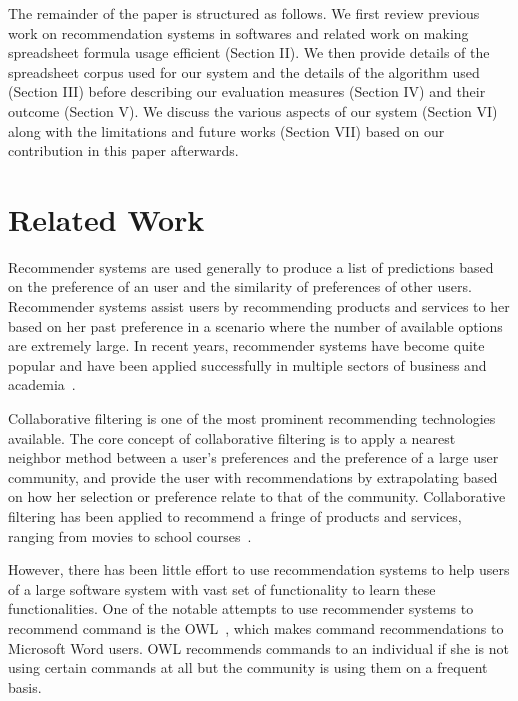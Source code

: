 \documentclass[conference]{IEEEtran}
\begin{document}
The remainder of the paper is structured as follows. We first review previous work on recommendation systems in softwares and related work on making spreadsheet formula usage efficient (Section II). We then provide details of the spreadsheet corpus used for our system and the details of the algorithm used (Section III) before describing our evaluation measures (Section IV) and their outcome (Section V). We discuss the various aspects of our system (Section VI) along with the limitations and future works (Section VII) based on our contribution in this paper afterwards.

\section{Related Work}
Recommender systems are used generally to produce a list of predictions based on the preference of an user and the similarity of preferences of other users. Recommender systems assist users by recommending  products and services to her based on her past preference in a scenario where the number of available options are extremely large. In recent years, recommender systems have become quite popular and have been applied successfully in multiple sectors of business and academia~\cite{hill1995recommending, resnick1994grouplens,shardanand1995social}. 

Collaborative filtering is one of the most prominent recommending technologies available. The core concept of collaborative filtering is to apply a nearest neighbor method between a user's preferences and the preference of a large user community, and provide the user with recommendations by extrapolating based on how her selection or preference relate to that of the community. Collaborative filtering has been applied to recommend a fringe of products and services, ranging from movies to school courses~\cite{miller2003movielens, resnick1994grouplens, linden2003amazon, liu2003adaptive, mcnee2006don, farzan2006social, hsu2008personalized}. 

However, there has been little effort to use recommendation systems to help users of a large   software system with vast set of functionality to learn these functionalities. One of the notable attempts to use recommender systems to recommend command is the OWL~\cite{linton2000owl}, which makes command recommendations to Microsoft Word users. OWL recommends commands to an individual if she is not using certain commands at all but the community is using them on a frequent basis.
\end{document}
